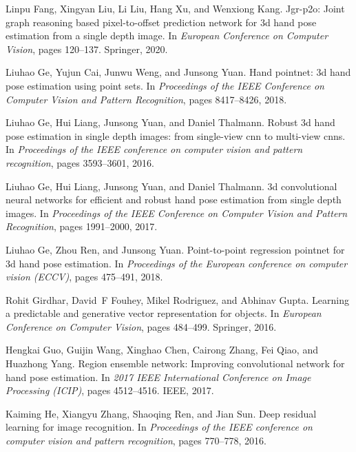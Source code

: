 \documentclass[10pt,twocolumn,letterpaper]{article}
\begin{document}
\begin{thebibliography}{10}
Linpu Fang, Xingyan Liu, Li Liu, Hang Xu, and Wenxiong Kang.
\newblock Jgr-p2o: Joint graph reasoning based pixel-to-offset prediction
  network for 3d hand pose estimation from a single depth image.
\newblock In {\em European Conference on Computer Vision}, pages 120--137.
  Springer, 2020.

Liuhao Ge, Yujun Cai, Junwu Weng, and Junsong Yuan.
\newblock Hand pointnet: 3d hand pose estimation using point sets.
\newblock In {\em Proceedings of the IEEE Conference on Computer Vision and
  Pattern Recognition}, pages 8417--8426, 2018.

Liuhao Ge, Hui Liang, Junsong Yuan, and Daniel Thalmann.
\newblock Robust 3d hand pose estimation in single depth images: from
  single-view cnn to multi-view cnns.
\newblock In {\em Proceedings of the IEEE conference on computer vision and
  pattern recognition}, pages 3593--3601, 2016.

Liuhao Ge, Hui Liang, Junsong Yuan, and Daniel Thalmann.
\newblock 3d convolutional neural networks for efficient and robust hand pose
  estimation from single depth images.
\newblock In {\em Proceedings of the IEEE Conference on Computer Vision and
  Pattern Recognition}, pages 1991--2000, 2017.

Liuhao Ge, Zhou Ren, and Junsong Yuan.
\newblock Point-to-point regression pointnet for 3d hand pose estimation.
\newblock In {\em Proceedings of the European conference on computer vision
  (ECCV)}, pages 475--491, 2018.

Rohit Girdhar, David~F Fouhey, Mikel Rodriguez, and Abhinav Gupta.
\newblock Learning a predictable and generative vector representation for
  objects.
\newblock In {\em European Conference on Computer Vision}, pages 484--499.
  Springer, 2016.

Hengkai Guo, Guijin Wang, Xinghao Chen, Cairong Zhang, Fei Qiao, and Huazhong
  Yang.
\newblock Region ensemble network: Improving convolutional network for hand
  pose estimation.
\newblock In {\em 2017 IEEE International Conference on Image Processing
  (ICIP)}, pages 4512--4516. IEEE, 2017.

Kaiming He, Xiangyu Zhang, Shaoqing Ren, and Jian Sun.
\newblock Deep residual learning for image recognition.
\newblock In {\em Proceedings of the IEEE conference on computer vision and
  pattern recognition}, pages 770--778, 2016.


\end{thebibliography}
\end{document}
